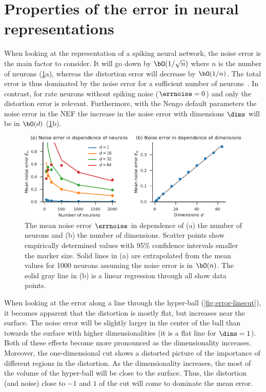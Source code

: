 \section{Properties of the error in neural representations}
When looking at the representation of a spiking neural network, the noise error is the main factor to consider.
It will go down by $\bO(1/\sqrt{n})$ where $n$ is the number of neurons (\cref{fig:noise-error}a), whereas the distortion error will decrease by $\bO(1/n)$.
The total error is thus dominated by the noise error for a sufficient number of neurons~\parencite[Fig.~2.6]{eliasmith2003}.
In contrast, for rate neurons without spiking noise ($\errnoise = 0$) and only the distortion error is relevant.
Furthermore, with the Nengo default parameters the noise error in the NEF the increase in the noise error with dimensions $\dims$ will be in $\bO(d)$ (\cref{fig:noise-error}b).
\begin{figure}
    \centering
    \includegraphics{figures/noise-error}
    \caption{The mean noise error $\errnoise$ in dependence of (a) the number of neurons and (b) the number of dimensions. Scatter points show empirically determined values with 95\% confidence intervals smaller the marker size. Solid lines in (a) are extrapolated from the mean values for \num{1000} neurons assuming the noise error is in $\bO(n)$. The solid gray line in (b) is a linear regression through all show data points.}\label{fig:noise-error}
\end{figure}

When looking at the error along a line through the hyper-ball (\cref{fig:error-linecut}), it becomes apparent that the distortion is mostly flat, but increases near the surface.
The noise error will be slightly larger in the center of the ball than towards the surface with higher dimensionalities (it is a flat line for $\dims = 1$).
Both of these effects become more pronounced as the dimensionality increases.
Moreover, the one-dimensional cut shows a distorted picture of the importance of different regions in the distortion.
As the dimensionality increases, the most of the volume of the hyper-ball will be close to the surface.
Thus, the distortion (and noise) close to $-1$ and $1$ of the cut will come to dominate the mean error.

